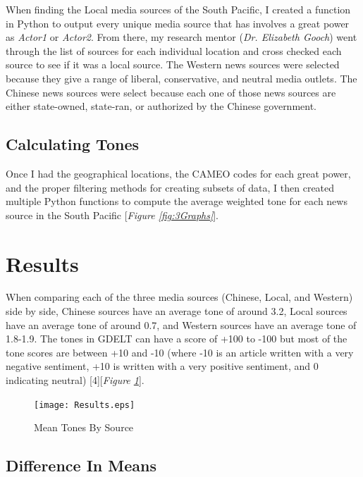 \documentclass[12pt]{article}
\begin{document}
When finding the Local media sources of the South Pacific, I created a function in Python to output every unique media source that has involves a great power as \textit{Actor1} or \textit{Actor2}. From there, my research mentor (\textit{Dr. Elizabeth Gooch}) went through the list of sources for each individual location and cross checked each source to see if it was a local source. The Western news sources were selected because they give a range of liberal, conservative, and neutral media outlets. The Chinese news sources were select because each one of those news sources are either state-owned, state-ran, or authorized by the Chinese government. 

\subsection*{Calculating Tones}

Once I had the geographical locations, the CAMEO codes for each great power, and the proper filtering methods for creating subsets of data, I then created multiple Python functions to compute the average weighted tone for each news source in the South Pacific [\textit{Figure \ref{fig:3Graphs}}].

\section*{Results}

When comparing each of the three media sources (Chinese, Local, and Western) side by side, Chinese sources have an average tone of around 3.2, Local sources have an average tone of around 0.7, and Western sources have an average tone of 1.8-1.9. The tones in GDELT can have a score of +100 to -100 but most of the tone scores are between +10 and -10 (where -10 is an article written with a very negative sentiment, +10 is written with a very positive sentiment, and 0 indicating neutral) [4][\textit{Figure \ref{fig:mesh4}}].

\begin{figure}[H]
	\centering
	\texttt{[image: Results.eps]}
	\caption{Mean Tones By Source}
    \label{fig:mesh4}
\end{figure}

\subsection*{Difference In Means}
\end{document}
